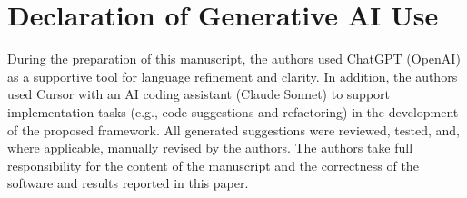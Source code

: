 \documentclass[]{einformatica}
\begin{document}





\appendix
\makeatletter
\def\mw@seccntformat#1{Appendix\ #1.\enspace}
\makeatother

\section{Declaration of Generative AI Use}\label{sec:ai_declaration}

During the preparation of this manuscript, the authors used ChatGPT (OpenAI) as a supportive tool for language refinement and clarity. In addition, the authors used Cursor with an AI coding assistant (Claude Sonnet) to support implementation tasks (e.g., code suggestions and refactoring) in the development of the proposed framework. All generated suggestions were reviewed, tested, and, where applicable, manually revised by the authors. The authors take full responsibility for the content of the manuscript and the correctness of the software and results reported in this paper.
\end{document}
